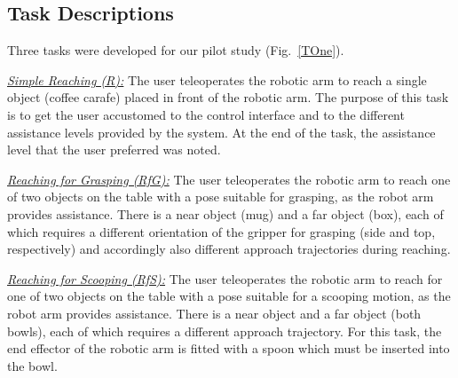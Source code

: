 \documentclass[letterpaper, 10 pt, journal, twoside]{IEEEtran}  %
\begin{document}
	\subsection{Task Descriptions}
	Three tasks were developed for our pilot study (Fig.~\ref{TOne}).
	
	\vspace{0.1cm}
	\noindent \uline{\textit{Simple Reaching (R):}}
	The user teleoperates the robotic arm to reach a single object (coffee carafe) placed in front of the robotic arm. The purpose of this task is to get the user accustomed to the control interface and to the different assistance levels provided by the system. At the end of the task, the assistance level that the user preferred was noted.
	
	\vspace{0.1cm}
	\noindent \uline{\textit{Reaching for Grasping (RfG):}}
	The user teleoperates the robotic arm to reach one of two objects on
	the table with a pose suitable for grasping, as the robot arm
	provides assistance. There is a near object (mug) and a far object
	(box), each of which requires a different orientation of the gripper
	for grasping (side and top, respectively) and accordingly also
	different approach trajectories during reaching.  
	
	\vspace{0.1cm}
	\noindent \uline{\textit{Reaching for Scooping (RfS):}}
	The user teleoperates the robotic arm to reach for one of two objects
	on the table with a pose suitable for a scooping
	motion, as the robot arm provides assistance. There is a near object
	and a far object (both bowls), each of which requires a different 
	approach trajectory.
	For this task, the end effector of the robotic arm is fitted with a
	spoon which must be inserted into the bowl.
	
\end{document}
